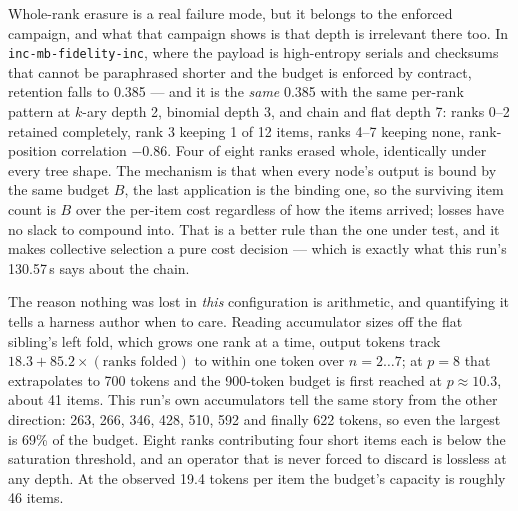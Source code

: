\documentclass[11pt]{article}
\begin{document}
Whole-rank erasure is a real failure mode, but it belongs to the enforced campaign, and
what that campaign shows is that depth is irrelevant there too. In
\texttt{inc-mb-fidelity-inc}, where the payload is high-entropy serials and checksums
that cannot be paraphrased shorter and the budget is enforced by contract, retention
falls to 0.385 --- and it is the \emph{same} 0.385 with the same per-rank pattern at
$k$-ary depth 2, binomial depth 3, and chain and flat depth 7: ranks 0--2 retained
completely, rank 3 keeping 1 of 12 items, ranks 4--7 keeping none, rank-position
correlation $-0.86$. Four of eight ranks erased whole, identically under every tree
shape. The mechanism is that when every node's output is bound by the same budget $B$,
the last application is the binding one, so the surviving item count is $B$ over the
per-item cost regardless of how the items arrived; losses have no slack to compound
into. That is a better rule than the one under test, and it makes collective selection a
pure cost decision --- which is exactly what this run's 130.57\,s says about the chain.

The reason nothing was lost in \emph{this} configuration is arithmetic, and quantifying
it tells a harness author when to care. Reading accumulator sizes off the flat sibling's
left fold, which grows one rank at a time, output tokens track
$18.3 + 85.2 \times (\text{ranks folded})$ to within one token over $n = 2 \dots 7$; at
$p = 8$ that extrapolates to 700 tokens and the 900-token budget is first reached at
$p \approx 10.3$, about 41 items. This run's own accumulators tell the same story from
the other direction: 263, 266, 346, 428, 510, 592 and finally 622 tokens, so even the
largest is 69\% of the budget. Eight ranks contributing four short items each is below
the saturation threshold, and an operator that is never forced to discard is lossless at
any depth. At the observed 19.4 tokens per item the budget's capacity is roughly 46
items.
\end{document}
